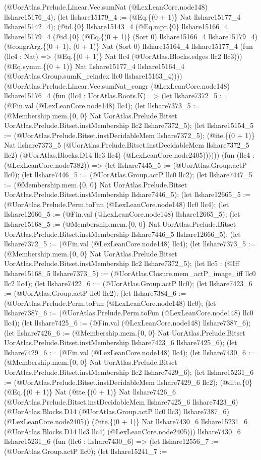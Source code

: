 \documentclass[11pt]{article}
\begin{document}
(@UorAtlas.Prelude.Linear.Vec.sumNat (@LexLeanCore.node148) llshare15176\_4); (let llshare15179\_4 := (@Eq.\{(0 + 1)\} Nat llshare15177\_4 llshare15142\_4); (@id.\{0\} llshare15143\_4 (@Eq.mpr.\{0\} llshare15166\_4 llshare15179\_4 (@id.\{0\} (@Eq.\{(0 + 1)\} (Sort 0) llshare15166\_4 llshare15179\_4) (@congrArg.\{(0 + 1), (0 + 1)\} Nat (Sort 0) llshare15164\_4 llshare15177\_4 (fun (llc4 : Nat) => (@Eq.\{(0 + 1)\} Nat llc4 (@UorAtlas.Blocks.edges llc2 llc3))) (@Eq.symm.\{(0 + 1)\} Nat llshare15177\_4 llshare15164\_4 (@UorAtlas.Group.sumK\_reindex llc0 llshare15163\_4)))) (@UorAtlas.Prelude.Linear.Vec.sumNat\_congr (@LexLeanCore.node148) llshare15176\_4 (fun (llc4 : UorAtlas.Roots.K) => (let llshare7372\_5 := (@Fin.val (@LexLeanCore.node148) llc4); (let llshare7373\_5 := (@Membership.mem.\{0, 0\} Nat UorAtlas.Prelude.Bitset UorAtlas.Prelude.Bitset.instMembership llc2 llshare7372\_5); (let llshare15154\_5 := (@UorAtlas.Prelude.Bitset.instDecidableMem llshare7372\_5); (@ite.\{(0 + 1)\} Nat llshare7373\_5 (@UorAtlas.Prelude.Bitset.instDecidableMem llshare7372\_5 llc2) (@UorAtlas.Blocks.D14 llc3 llc4) (@LexLeanCore.node2405)))))) (fun (llc4 : (@LexLeanCore.node7382)) => (let llshare7445\_5 := (@UorAtlas.Group.actP llc0); (let llshare7446\_5 := (@UorAtlas.Group.actP llc0 llc2); (let llshare7447\_5 := (@Membership.mem.\{0, 0\} Nat UorAtlas.Prelude.Bitset UorAtlas.Prelude.Bitset.instMembership llshare7446\_5); (let llshare12665\_5 := (@UorAtlas.Prelude.Perm.toFun (@LexLeanCore.node148) llc0 llc4); (let llshare12666\_5 := (@Fin.val (@LexLeanCore.node148) llshare12665\_5); (let llshare15168\_5 := (@Membership.mem.\{0, 0\} Nat UorAtlas.Prelude.Bitset UorAtlas.Prelude.Bitset.instMembership llshare7446\_5 llshare12666\_5); (let llshare7372\_5 := (@Fin.val (@LexLeanCore.node148) llc4); (let llshare7373\_5 := (@Membership.mem.\{0, 0\} Nat UorAtlas.Prelude.Bitset UorAtlas.Prelude.Bitset.instMembership llc2 llshare7372\_5); (let llc5 : (@Iff llshare15168\_5 llshare7373\_5) := (@UorAtlas.Closure.mem\_actP\_image\_iff llc0 llc2 llc4); (let llshare7422\_6 := (@UorAtlas.Group.actP llc0); (let llshare7423\_6 := (@UorAtlas.Group.actP llc0 llc2); (let llshare7384\_6 := (@UorAtlas.Prelude.Perm.toFun (@LexLeanCore.node148) llc0); (let llshare7387\_6 := (@UorAtlas.Prelude.Perm.toFun (@LexLeanCore.node148) llc0 llc4); (let llshare7425\_6 := (@Fin.val (@LexLeanCore.node148) llshare7387\_6); (let llshare7426\_6 := (@Membership.mem.\{0, 0\} Nat UorAtlas.Prelude.Bitset UorAtlas.Prelude.Bitset.instMembership llshare7423\_6 llshare7425\_6); (let llshare7429\_6 := (@Fin.val (@LexLeanCore.node148) llc4); (let llshare7430\_6 := (@Membership.mem.\{0, 0\} Nat UorAtlas.Prelude.Bitset UorAtlas.Prelude.Bitset.instMembership llc2 llshare7429\_6); (let llshare15231\_6 := (@UorAtlas.Prelude.Bitset.instDecidableMem llshare7429\_6 llc2); (@dite.\{0\} (@Eq.\{(0 + 1)\} Nat (@ite.\{(0 + 1)\} Nat llshare7426\_6 (@UorAtlas.Prelude.Bitset.instDecidableMem llshare7425\_6 llshare7423\_6) (@UorAtlas.Blocks.D14 (@UorAtlas.Group.actP llc0 llc3) llshare7387\_6) (@LexLeanCore.node2405)) (@ite.\{(0 + 1)\} Nat llshare7430\_6 llshare15231\_6 (@UorAtlas.Blocks.D14 llc3 llc4) (@LexLeanCore.node2405))) llshare7430\_6 llshare15231\_6 (fun (llc6 : llshare7430\_6) => (let llshare12556\_7 := (@UorAtlas.Group.actP llc0); (let llshare15241\_7 := 
\end{document}
